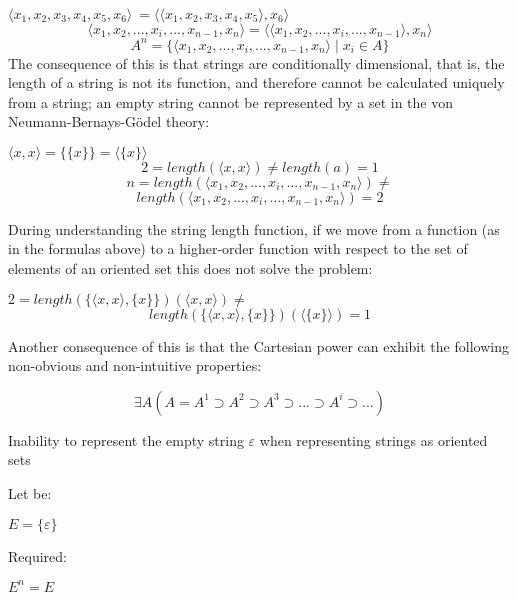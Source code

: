 \documentclass[10pt, a4paper]{article}
\begin{document}
\begin{multicols}{2}
$\langle x_1,x_2,x_3,x_4,x_5,x_6\rangle\ = \langle \langle x_1,x_2,x_3,x_4,x_5\rangle ,x_6 \rangle$
\[\langle x_1,x_2, ..., x_i, ..., x_{n-1}, x_n \rangle =\langle\langle x_1, x_2, ..., x_i, ..., x_{n-1}\rangle,x_n\rangle\]
\[A^n = \{\langle x_1,x_2, ..., x_i, ..., x_{n-1}, x_n \rangle \mid x_i \in A\}\]
The consequence of this is that strings are conditionally
dimensional, that is, the length of a string is not its
function, and therefore cannot be calculated uniquely
from a string; an empty string cannot be represented by
a set in the von Neumann-Bernays-Gödel theory:
\begin{center}
\vspace{0.25cm}
$\langle x,x \rangle = \{\{x\}\} = \langle \{x\} \rangle$
\[2 = length(\langle x,x \rangle) \neq length(a) = 1\]
\[n = length(\langle x_1, x_2, ..., x_i, ..., x_{n-1}, x_n \rangle) \neq \] \[ length(\langle x_1, x_2, ..., x_i, ..., x_{n-1}, x_n \rangle) = 2\]
\end{center}
\vspace{0.25cm}
During understanding the string length function, if we
move from a function (as in the formulas above) to a
higher-order function with respect to the set of elements
of an oriented set this does not solve the problem:
\vspace{0.25cm}
\begin{center}
$2 = length(\{\langle x,x \rangle , \{x\}\})(\langle x,x \rangle) \neq $ \[length(\{\langle x,x \rangle , \{x\}\})(\langle \{x\} \rangle) = 1\]
\end{center}
Another consequence of this is that the Cartesian power
can exhibit the following non-obvious and non-intuitive
properties:
\begin{center}
    \[\exists A(A = A^1 \supset A^2 \supset A^3 \supset ... \supset A^i \supset ...)\]
\end{center}
Inability to represent the empty string $\varepsilon$ when representing strings as oriented sets

Let be:
\vspace{0.3cm}
\begin{center}
$E = \{\varepsilon\}$
\end{center}

Required:
\vspace{0.3cm}
\begin{center}
$E^n = E$
\end{center}


\end{multicols}
\end{document}
